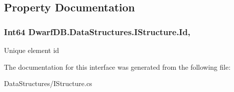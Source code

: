 \subsection{Property Documentation}
\hypertarget{interface_dwarf_d_b_1_1_data_structures_1_1_i_structure_a20776b8ffebc8d77080ef4b9e9817e85}{
\subsubsection[{Id}]{\setlength{\rightskip}{0pt plus 5cm}Int64 Dwarf\+D\+B.\+Data\+Structures.\+I\+Structure.\+Id\hspace{0.3cm}{\ttfamily [get]}, {\ttfamily [set]}}}\label{interface_dwarf_d_b_1_1_data_structures_1_1_i_structure_a20776b8ffebc8d77080ef4b9e9817e85}


Unique element id 



The documentation for this interface was generated from the following file\+:\begin{DoxyCompactItemize}
\item 
Data\+Structures/I\+Structure.\+cs\end{DoxyCompactItemize}
